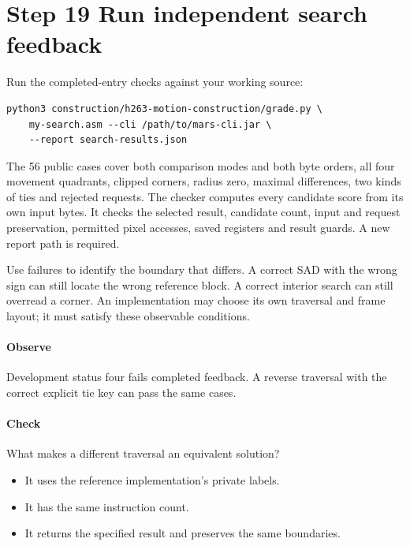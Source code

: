 \section{Step 19 Run independent search feedback}\label{h263-motion-s09}
Run the completed-entry checks against your working source:
\begin{verbatim}
python3 construction/h263-motion-construction/grade.py \
    my-search.asm --cli /path/to/mars-cli.jar \
    --report search-results.json
\end{verbatim}
The 56 public cases cover both comparison modes and both byte orders, all four
movement quadrants, clipped corners, radius zero, maximal differences, two kinds
of ties and rejected requests. The checker computes every candidate score from
its own input bytes. It checks the selected result, candidate count, input and
request preservation, permitted pixel accesses, saved registers and result guards.
A new report path is required.

Use failures to identify the boundary that differs. A correct SAD with the wrong
sign can still locate the wrong reference block. A correct interior search can
still overread a corner. An implementation may choose its own traversal and
frame layout; it must satisfy these observable conditions.

\paragraph{Observe} Development status four fails completed feedback. A reverse
traversal with the correct explicit tie key can pass the same cases.
\Needspace{8\baselineskip}
\paragraph{Check} What makes a different traversal an equivalent solution?
\begin{itemize}
  \item[A.] It uses the reference implementation's private labels.
  \item[B.] It has the same instruction count.
  \item[C.] It returns the specified result and preserves the same boundaries.
\end{itemize}
